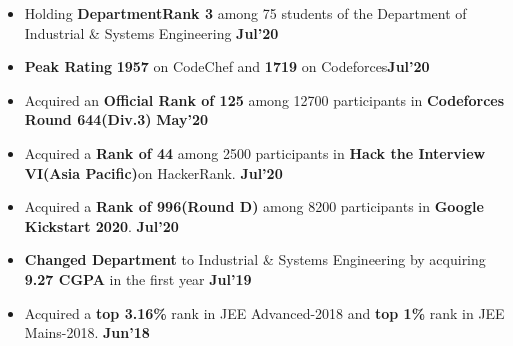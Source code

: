 \documentclass[10pt]{article}
\begin{document}
\vspace{-0.5ex}
\spacedhrule{0.15ex}{1.0ex}
\begin{itemize}[leftmargin=*]
\item Holding \textbf{DepartmentRank 3} among 75 students of the Department of Industrial \& Systems Engineering {\hfill}\textbf{Jul'20}\\[-1.8em]
\item \textbf{Peak Rating} \textbf{1957} on CodeChef\href{https://www.codechef.com/users/mintu_agarwal}{\hspace{0.5ex}\footnotesize\faMousePointer} and \textbf {1719} on Codeforces\href{https://codeforces.com/profile/madmin2619}{\hspace{0.5ex}\footnotesize\faMousePointer\hspace{0.5ex}}{\hfill}\textbf{Jul'20}\\[-1.8em]
\item Acquired an \textbf{Official Rank of 125} among 12700 participants in \textbf{Codeforces Round 644(Div.3)}
\href{https://codeforces.com/contest/1360/standings/participant/65953755#p65953755} {\hspace{0.5ex}\footnotesize\faMousePointer} {\hfill}\textbf{May'20}\\[-1.8em]
\item Acquired a \textbf{Rank of 44} among 2500 participants in \textbf{Hack the Interview VI(Asia Pacific)}on HackerRank. 
\href{https://www.hackerrank.com/results/hack-the-interview-vi-asia-pacific/madmin2619} {\hspace{0.5ex}\footnotesize\faMousePointer} {\hfill}\textbf{Jul'20}\\[-1.8em]
\item Acquired a \textbf{Rank of 996(Round D)} among 8200 participants in \textbf{Google Kickstart 2020}.
\href{https://github.com/Mintuagarwal/Credentials/blob/master/Competitive-programming/KickStartRoundD.pdf} {\hspace{0.5ex}\footnotesize\faMousePointer} {\hfill}\textbf{Jul'20}\\[-1.8em]
\item \textbf{Changed Department} to Industrial \& Systems Engineering by acquiring \textbf{9.27 CGPA} in the first year \href{https://github.com/Mintuagarwal/Credentials/blob/master/Academics} {\hspace{0.5ex}\footnotesize\faMousePointer} {\hfill}\textbf{Jul'19}\\[-1.8em]
 \item Acquired a \textbf{top 3.16\%} rank in JEE Advanced-2018 and \textbf{top 1\%} rank in JEE Mains-2018. \href{https://github.com/Mintuagarwal/Credentials/blob/master/Academics/JoSAA.pdf} {\hspace{0.5ex}\footnotesize\faMousePointer} {\hfill}\textbf{Jun'18}\\[-1.8em]

\end{itemize}
\end{document}
